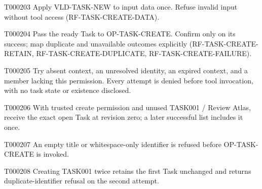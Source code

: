 \documentclass[11pt,a4paper]{article}
\begin{document}
\begin{atlasparagraph}{T000203}
Apply VLD-TASK-NEW to input data once. Refuse invalid input without tool access (RF-TASK-CREATE-DATA).
\end{atlasparagraph}
\begin{atlasparagraph}{T000204}
Pass the ready Task to OP-TASK-CREATE. Confirm only on its success; map duplicate and unavailable outcomes explicitly (RF-TASK-CREATE-RETAIN, RF-TASK-CREATE-DUPLICATE, RF-TASK-CREATE-FAILURE).
\end{atlasparagraph}
\begin{atlasparagraph}{T000205}
Try absent context, an unresolved identity, an expired context, and a member lacking this permission. Every attempt is denied before tool invocation, with no task state or existence disclosed.
\end{atlasparagraph}
\begin{atlasparagraph}{T000206}
With trusted create permission and unused TASK001 / Review Atlas, receive the exact open Task at revision zero; a later successful list includes it once.
\end{atlasparagraph}
\begin{atlasparagraph}{T000207}
An empty title or whitespace-only identifier is refused before OP-TASK-CREATE is invoked.
\end{atlasparagraph}
\begin{atlasparagraph}{T000208}
Creating TASK001 twice retains the first Task unchanged and returns duplicate-identifier refusal on the second attempt.
\end{atlasparagraph}
\end{document}
